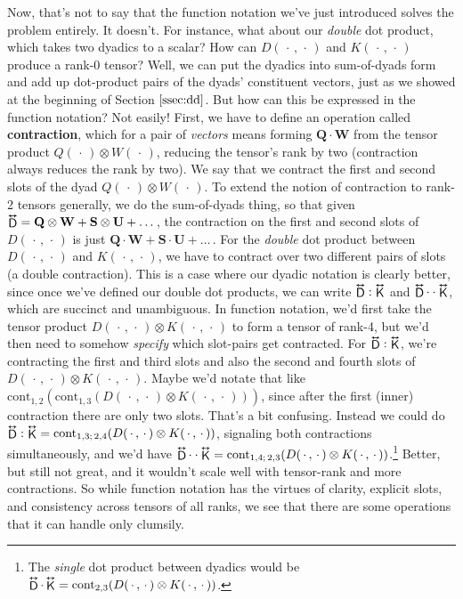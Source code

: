 \documentclass[12pt]{article}
\renewcommand{\vv}[1]{\mathbf{#1}}
\newcommand{\tightoverset}[2]{%
  \mathop{#2}\limits^{\vbox to -.5ex{\kern-0.75ex\hbox{$#1$}\vss}}}
\newcommand{\inlinedy}[1]{\tightoverset{\text{\tiny$\bm\leftrightarrow$}}{#1}}
\newcommand{\fnoverset}[2]{%
  \mathop{#2}\limits^{\vbox to -.5ex{\kern-0.85ex\hbox{$#1$}\vss}}}
\newcommand{\footnotedy}[1]{\fnoverset{\text{\tiny$\bm\leftrightarrow$}}{#1}}
\begin{document}
Now, that's not to say that the function notation we've just introduced solves the problem entirely. It doesn't. For instance, what about our \emph{double} dot product, which takes two dyadics to a scalar? How can $D(\, \cdot \, , \, \cdot \,)$ and $K(\, \cdot \, , \, \cdot \,)$ produce a rank-0 tensor? Well, we can put the dyadics into sum-of-dyads form and add up dot-product pairs of the dyads' constituent vectors, just as we showed at the beginning of Section $\ref{ssec:dd}$. But how can this be expressed in the function notation? Not easily! First, we have to define an operation called \textbf{contraction}, which for a pair of \emph{vectors} means forming $\vv Q \cdot \vv W$ from the tensor product $Q(\, \cdot \, ) \otimes W(\, \cdot \, )$, reducing the tensor's rank by two (contraction always reduces the rank by two). We say that we contract the first and second slots of the dyad $Q(\, \cdot \, ) \otimes W(\, \cdot \, )$. To extend the notion of contraction to rank-2 tensors generally, we do the sum-of-dyads thing, so that given $\inlinedy{\mathsf{D}} = \vv Q \otimes \vv W + \vv S \otimes \vv U + \ldots \,$, the contraction on the first and second slots of $D(\, \cdot \, , \, \cdot \,)$ is just $\vv Q \cdot \vv W + \vv S \cdot \vv U + \ldots \,$. For the \emph{double} dot product between $D(\, \cdot \, , \, \cdot \,)$ and $K(\, \cdot \, , \, \cdot \,)$, we have to contract over two different pairs of slots (a double contraction). This is a case where our dyadic notation is clearly better, since once we've defined our double dot products, we can write $\inlinedy{\mathsf{D}} : \inlinedy{\mathsf{K}}$ and $\inlinedy{\mathsf{D}} \cdot \cdot \inlinedy{\mathsf{K}}$, which are succinct and unambiguous. In function notation, we'd first take the tensor product $D(\, \cdot \, , \, \cdot \,) \otimes K(\, \cdot \, , \, \cdot \,)$ to form a tensor of rank-4, but we'd then need to somehow \emph{specify} which slot-pairs get contracted. For $\inlinedy{\mathsf{D}} : \inlinedy{\mathsf{K}}$, we're contracting the first and third slots and also the second and fourth slots of  $D(\, \cdot \, , \, \cdot \,) \otimes K(\, \cdot \, , \, \cdot \,)$. Maybe we'd notate that like ${\textrm{cont}_{1,2}(\textrm{cont}_{1,3}(D(\, \cdot \, , \, \cdot \,) \otimes K(\, \cdot \, , \, \cdot \,)))}$, since after the first (inner) contraction there are only two slots. That's a bit confusing. Instead we could do  ${\inlinedy{\mathsf{D}} : \inlinedy{\mathsf{K}} = \textrm{cont}_{1,3; \, 2,4}(D(\, \cdot \, , \, \cdot \,) \otimes K(\, \cdot \, , \, \cdot \,))}$, signaling both contractions simultaneously, and we'd have $\inlinedy{\mathsf{D}} \cdot \cdot \inlinedy{\mathsf{K}} = \textrm{cont}_{1,4; \, 2,3}(D(\, \cdot \, , \, \cdot \,) \otimes K(\, \cdot \, , \, \cdot \,))$.\footnote{The \emph{single} dot product between dyadics would be $\footnotedy{\mathsf{D}} \cdot \footnotedy{\mathsf{K}} = \textrm{cont}_{2,3}(D(\, \cdot \, , \, \cdot \,) \otimes K(\, \cdot \, , \, \cdot \,))$.} Better, but still not great, and it wouldn't scale well with tensor-rank and more contractions. So while function notation has the virtues of clarity, explicit slots, and consistency across tensors of all ranks, we see that there are some operations that it can handle only clumsily.
\end{document}
